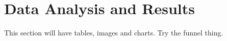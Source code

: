 \chapter[Results]{Data Analysis and Results}
This section will have tables, images and charts.
Try the funnel thing.

%
